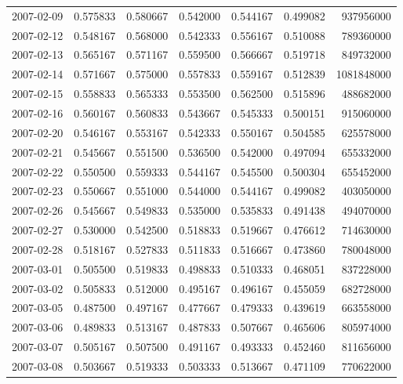 \begin{tabular}{lrrrrrr}
2007-02-09 &    0.575833 &    0.580667 &    0.542000 &    0.544167 &    0.499082 &   937956000 \\
2007-02-12 &    0.548167 &    0.568000 &    0.542333 &    0.556167 &    0.510088 &   789360000 \\
2007-02-13 &    0.565167 &    0.571167 &    0.559500 &    0.566667 &    0.519718 &   849732000 \\
2007-02-14 &    0.571667 &    0.575000 &    0.557833 &    0.559167 &    0.512839 &  1081848000 \\
2007-02-15 &    0.558833 &    0.565333 &    0.553500 &    0.562500 &    0.515896 &   488682000 \\
2007-02-16 &    0.560167 &    0.560833 &    0.543667 &    0.545333 &    0.500151 &   915060000 \\
2007-02-20 &    0.546167 &    0.553167 &    0.542333 &    0.550167 &    0.504585 &   625578000 \\
2007-02-21 &    0.545667 &    0.551500 &    0.536500 &    0.542000 &    0.497094 &   655332000 \\
2007-02-22 &    0.550500 &    0.559333 &    0.544167 &    0.545500 &    0.500304 &   655452000 \\
2007-02-23 &    0.550667 &    0.551000 &    0.544000 &    0.544167 &    0.499082 &   403050000 \\
2007-02-26 &    0.545667 &    0.549833 &    0.535000 &    0.535833 &    0.491438 &   494070000 \\
2007-02-27 &    0.530000 &    0.542500 &    0.518833 &    0.519667 &    0.476612 &   714630000 \\
2007-02-28 &    0.518167 &    0.527833 &    0.511833 &    0.516667 &    0.473860 &   780048000 \\
2007-03-01 &    0.505500 &    0.519833 &    0.498833 &    0.510333 &    0.468051 &   837228000 \\
2007-03-02 &    0.505833 &    0.512000 &    0.495167 &    0.496167 &    0.455059 &   682728000 \\
2007-03-05 &    0.487500 &    0.497167 &    0.477667 &    0.479333 &    0.439619 &   663558000 \\
2007-03-06 &    0.489833 &    0.513167 &    0.487833 &    0.507667 &    0.465606 &   805974000 \\
2007-03-07 &    0.505167 &    0.507500 &    0.491167 &    0.493333 &    0.452460 &   811656000 \\
2007-03-08 &    0.503667 &    0.519333 &    0.503333 &    0.513667 &    0.471109 &   770622000 \\

\end{tabular}
